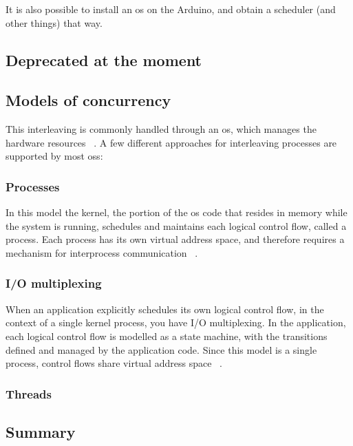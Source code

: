 



It is also possible to install an \gls{os} on the Arduino, and obtain a scheduler (and other things) that way.

\subsection*{Deprecated at the moment}
\subsection{Models of concurrency}\label{subsec:modelsofcon}
This interleaving is commonly handled through an \gls{os}, which manages the hardware resources ~\cite{Bryant2016}. A few different approaches for interleaving processes are supported by most \glspl{os}:

\subsubsection{Processes}
In this model the kernel, the portion of the \gls{os} code that resides in memory while the system is running, schedules and maintains each logical control flow, called a process. Each process has its own virtual address space, and therefore requires a mechanism for interprocess communication ~\cite{Bryant2016}.

\subsubsection{I/O multiplexing}
When an application explicitly schedules its own logical control flow, in the context of a single kernel process, you have I/O multiplexing. In the application, each logical control flow is modelled as a state machine, with the transitions defined and managed by the application code. Since this model is a single process, control flows share virtual address space ~\cite{Bryant2016}.

\subsubsection{Threads}


\subsection{Summary}

